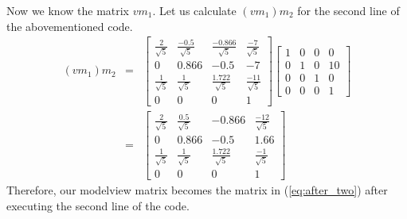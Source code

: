 \begin{itemize}
{        Now we know the matrix $vm_1$. Let us calculate $(vm_1)m_2$ for the second line of the abovementioned code.
        \begin{eqnarray}
            (vm_1) m_2 &=& \begin{bmatrix}
               \frac{2}{\sqrt{5}} & \frac{-0.5}{\sqrt{5}} & \frac{-0.866}{\sqrt{5}} & \frac{-7}{\sqrt{5}}\\
               0 & 0.866 & -0.5 & -7\\
               \frac{1}{\sqrt{5}} & \frac{1}{\sqrt{5}} & \frac{1.722}{\sqrt{5}} & \frac{-11}{\sqrt{5}}\\
               0 & 0 & 0 & 1
           \end{bmatrix}
           \begin{bmatrix}
                   1 & 0 & 0 & 0\\
                   0 & 1 & 0 & 10\\
                   0 & 0 & 1 & 0\\
                   0 & 0 & 0 & 1
                   \end{bmatrix}\\
                   &=& \begin{bmatrix}
                       \frac{2}{\sqrt{5}} & \frac{0.5}{\sqrt{5}} & -0.866 & \frac{-12}{\sqrt{5}}\\
                       0 & 0.866 & -0.5 & 1.66\\
                       \label{eq:after_two}
                       \frac{1}{\sqrt{5}} & \frac{1}{\sqrt{5}} & \frac{1.722}{\sqrt{5}} & \frac{-1}{\sqrt{5}}\\
                       0 & 0 & 0 & 1
                        \end{bmatrix}
        \end{eqnarray}
        Therefore, our modelview matrix becomes the matrix in (\ref{eq:after_two}) after executing the second line
        of the code.
    }
\end{itemize}